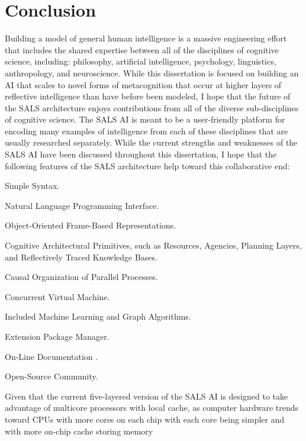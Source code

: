 \chapter{Conclusion}
\label{chapter:conclusion}

Building a model of general human intelligence is a massive
engineering effort that includes the shared expertise between all of
the disciplines of cognitive science, including: philosophy,
artificial intelligence, psychology, linguistics, anthropology, and
neuroscience.  While this dissertation is focused on building an AI
that scales to novel forms of metacognition that occur at higher
layers of reflective intelligence than have before been modeled, I
hope that the future of the SALS architecture enjoys contributions
from all of the diverse sub-disciplines of cognitive science.  The
SALS AI is meant to be a user-friendly platform for encoding many
examples of intelligence from each of these disciplines that are
usually researched separately.  While the current strengths and
weaknesses of the SALS AI have been discussed throughout this
dissertation, I hope that the following features of the SALS
architecture help toward this collaborative end:
\begin{packed_enumerate}
\item{Simple Syntax.}
\item{Natural Language Programming Interface.}
\item{Object-Oriented Frame-Based Representations.}
\item{Cognitive Architectural Primitives, such as Resources, Agencies,
  Planning Layers, and Reflectively Traced Knowledge Bases.}
\item{Causal Organization of Parallel Processes.}
\item{Concurrent Virtual Machine.}
\item{Included Machine Learning and Graph Algorithms.}
\item{Extension Package Manager.}
\item{On-Line Documentation \cite[]{morgan:2012}.}
\item{Open-Source Community.}
\end{packed_enumerate}
Given that the current five-layered version of the SALS AI is designed
to take advantage of multicore processors with local cache, as
computer hardware trends toward CPUs with more cores on each chip with
each core being simpler and with more on-chip cache storing memory
